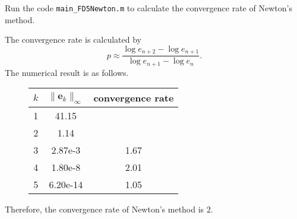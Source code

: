 \begin{pro}
  Run the code \verb|main_FD5Newton.m|
  to calculate the convergence rate of Newton's method.
\end{pro}
\begin{sol}
  The convergence rate is calculated by
  \begin{displaymath}
    p \approx \frac{\log e_{n+2}-\log e_{n+1}}{\log e_{n+1} - \log e_n}.
  \end{displaymath}
  The numerical result is as follows.
  \begin{figure}[H]
  \centering
\begin{tabular}{c|c|c}
  \centering
  $k$ & $\|\bm{e}_k\|_{\infty}$ & convergence rate
  \\ \hline
  1 & 41.15 &
  \\
  2 & 1.14 & 
  \\
  3& 2.87e-3 & 1.67
  \\
  4 & 1.80e-8 & 2.01
  \\
  5 & 6.20e-14 & 1.05
  \\ \hline
\end{tabular}
\end{figure}
Therefore,
the convergence rate of Newton's method is $2$.
\end{sol}
